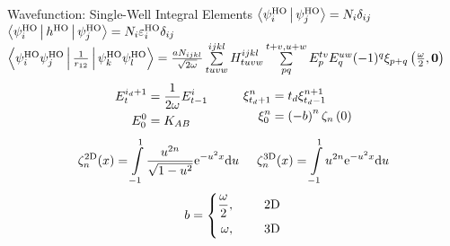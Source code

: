 \documentclass[10pt, t]{beamer}
\begin{document}
\begin{frame}[fragile]{Wavefunction: Single-Well Integral Elements}
    \centering\small
    $\Braket{\psiHO_i|\psiHO_j} = N_i \delta_{ij}$ \\
    $\Braket{\psiHO_i|h^{\text{HO}}|\psiHO_j} =
    N_i\varepsilon^{\text{HO}}_i\delta_{ij}$ \\
    $\Braket{\psiHO_i\psiHO_j|\frac{1}{r_{12}}|\psiHO_k\psiHO_l} =
    \frac{aN_{ijkl}}{\sqrt{2\omega}}  \sum\limits^{ijkl}_{tuvw} H^{ijkl}_{tuvw}
    \suml{pq}{t+v,u+w} E^{tv}_pE^{uw}_q (-1)^q\xi_{p+q}\left(\frac{\omega}{2},
    \blds{0}\right)$
        \begin{equation*}
            \begin{aligned}
                E^{i_d+1}_t &= \frac{1}{2\omega}E^{i}_{t-1} \\
                E^{0}_0 &= K_{AB}
            \end{aligned}\hspace{1.0cm}
            \begin{aligned}
                \xi^n_{t_d+1} &= t_d\xi^{n+1}_{t_d-1} \\
                \xi^n_0 &= \left(-b\right)^n \zeta_n\left(0\right)
            \end{aligned}
        \end{equation*}
        \begin{equation*}
            \begin{aligned}
                \zeta^{\text{2D}}_n(x) = \int\limits^1_{-1} \frac{u^{2n}}{\sqrt{1 -
                u^2}} \me^{-u^2x} \md u
            \end{aligned} \hspace{0.5cm}
            \begin{aligned}
                \zeta^{\text{3D}}_n(x) = \int\limits^1_{-1} u^{2n} \me^{-u^2x}
                \md u
            \end{aligned}
        \end{equation*}
        \begin{equation*}
            b =
            \left\{\begin{aligned}
                \frac{\omega}{2},&\indent &\text{2D} \\
                \omega,&\indent &\text{3D}
            \end{aligned}\right.
        \end{equation*}
\end{frame}
\end{document}
